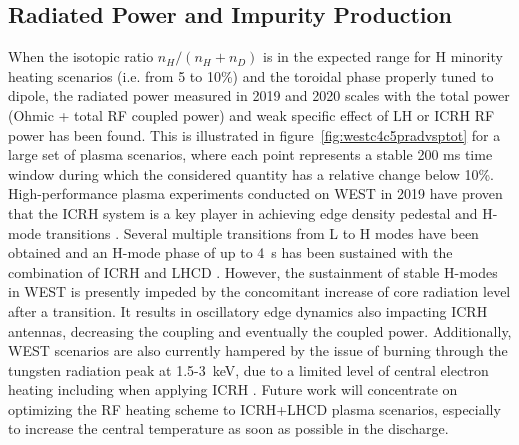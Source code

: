 \documentclass[12p]{iopart}
\begin{document}
\subsection{Radiated Power and Impurity Production}
When the isotopic ratio $n_H/(n_H+n_D)$ is in the expected range for H minority heating scenarios (i.e. from 5 to 10\%) and the toroidal phase properly tuned to dipole, the radiated power measured in 2019 and 2020 scales with the total power (Ohmic + total RF coupled power) and weak specific effect of LH or ICRH RF power has been found. This is illustrated in figure~\ref{fig:westc4c5pradvsptot} for a large set of plasma scenarios, where each point represents a stable 200 ms time window during which the considered quantity has a relative change below 10\%. High-performance plasma experiments conducted on WEST in 2019 have proven that the ICRH system is a key player in achieving edge density pedestal and H-mode transitions \cite{goniche2021,vermare2021}. Several multiple transitions from L to H modes have been obtained and an H-mode phase of up to \SI{4}{\second} has been sustained with the combination of ICRH and LHCD \cite{bucalossi2021}. However, the sustainment of stable H-modes in WEST is presently impeded by the concomitant increase of core radiation level after a transition. It results in oscillatory edge dynamics also impacting ICRH antennas, decreasing the coupling and eventually the coupled power. Additionally, WEST scenarios are also currently hampered by the issue of burning through the tungsten radiation peak at 1.5-\SI{3}{\kilo\electronvolt}, due to a limited level of central electron heating including when applying ICRH \cite{goniche2021}. Future work will concentrate on optimizing the RF heating scheme to ICRH+LHCD plasma scenarios, especially to increase the central temperature as soon as possible in the discharge. 
\end{document}
